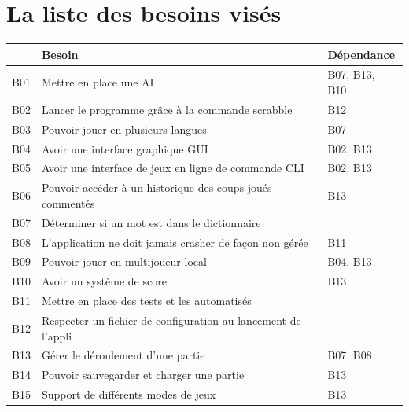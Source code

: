 \documentclass[a4paper,12pt]{article}
\begin{document}

\section{La liste des besoins visés}


\begin{table}[H]
\centering

\begin{tabular}{| l | l | l |}
\hline
 & Besoin & Dépendance \\
\hline
B01 & Mettre en place une AI & B07, B13, B10 \\
\hline
B02 & Lancer le programme grâce à la commande scrabble & B12 \\
\hline
B03 & Pouvoir jouer en plusieurs langues & B07 \\
\hline
B04 & Avoir une interface graphique GUI & B02, B13 \\
\hline
B05 & Avoir une interface de jeux en ligne de commande CLI & B02, B13 \\
\hline
B06 & Pouvoir accéder à un historique des coups joués commentés & B13 \\
\hline
B07 & Déterminer si un mot est dans le dictionnaire &  \\
\hline
B08 & L’application ne doit jamais crasher de façon non gérée & B11 \\
\hline
B09 & Pouvoir jouer en multijoueur local & B04, B13 \\
\hline
B10 & Avoir un système de score & B13 \\
\hline
B11 & Mettre en place des tests et les automatisés &  \\
\hline
B12 & Respecter un fichier de configuration au lancement de l’appli &  \\
\hline
B13 & Gérer le déroulement d’une partie & B07, B08 \\
\hline
B14 & Pouvoir sauvegarder et charger une partie & B13 \\
\hline
B15 & Support de différents modes de jeux & B13 \\
\hline

\end{tabular}

\end{table}
\end{document}
